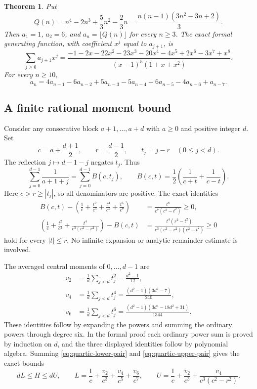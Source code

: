 \documentclass[11pt]{article}
\newtheorem{theorem}{Theorem}[section]
\begin{document}
\begin{theorem}\label{thm:quartic-main}
Put
\[
 Q(n)=n^4-2n^3+\frac53n^2-\frac23n
      =\frac{n(n-1)(3n^2-3n+2)}3.
\]
Then $a_1=1$, $a_2=6$, and $a_n=\lfloor Q(n)\rfloor$ for every $n\ge3$.
The exact formal generating function, with coefficient $x^j$ equal to
$a_{j+1}$, is
\begin{equation}\label{eq:quartic-gf}
 \sum_{j\ge0}a_{j+1}x^j=
 \frac{-1-2x-22x^2-23x^3-20x^4-4x^5+2x^6-3x^7+x^8}
 {(x-1)^5(1+x+x^2)}.
\end{equation}
For every $n\ge10$,
\begin{equation}\label{eq:quartic-recurrence}
 a_n=4a_{n-1}-6a_{n-2}+5a_{n-3}-5a_{n-4}
       +6a_{n-5}-4a_{n-6}+a_{n-7}.
\end{equation}
\end{theorem}

\subsection{A finite rational moment bound}

Consider any consecutive block $a+1,\ldots,a+d$ with $a\ge0$ and
positive integer $d$. Set
\[
 c=a+\frac{d+1}2,\qquad r=\frac{d-1}2,\qquad t_j=j-r\quad(0\le j<d).
\]
The reflection $j\mapsto d-1-j$ negates $t_j$. Thus
\begin{equation}\label{eq:quartic-pairing}
 \sum_{j=0}^{d-1}\frac1{a+1+j}
 =\sum_{j=0}^{d-1} B(c,t_j),\qquad
 B(c,t)=\frac12\left(\frac1{c+t}+\frac1{c-t}\right).
\end{equation}
Here $c>r\ge|t_j|$, so all denominators are positive.
The exact identities
\begin{align}
 B(c,t)-\left(\frac1c+\frac{t^2}{c^3}+\frac{t^4}{c^5}+\frac{t^6}{c^7}\right)
 &=\frac{t^8}{c^7(c^2-t^2)}\ge0,\label{eq:quartic-lower-pair}\\
 \left(\frac1c+\frac{t^2}{c^3}+\frac{t^4}{c^3(c^2-r^2)}\right)-B(c,t)
 &=\frac{t^4(r^2-t^2)}{c^3(c^2-r^2)(c^2-t^2)}\ge0
 \label{eq:quartic-upper-pair}
\end{align}
hold for every $|t|\le r$. No infinite expansion or analytic remainder
estimate is involved.

The averaged central moments of $0,\ldots,d-1$ are
\begin{align*}
 v_2&=\frac1d\sum_{j<d}t_j^2=\frac{d^2-1}{12},\\
 v_4&=\frac1d\sum_{j<d}t_j^4=\frac{(d^2-1)(3d^2-7)}{240},\\
 v_6&=\frac1d\sum_{j<d}t_j^6=\frac{(d^2-1)(3d^4-18d^2+31)}{1344}.
\end{align*}
These identities follow by expanding the powers and summing the ordinary
powers through degree six. In the formal proof each ordinary power sum
is proved by induction on $d$, and the three displayed identities follow
by polynomial algebra. Summing \eqref{eq:quartic-lower-pair} and
\eqref{eq:quartic-upper-pair} gives the exact bounds
\begin{equation}\label{eq:quartic-LU}
 dL\le H\le dU,\qquad
 L=\frac1c+\frac{v_2}{c^3}+\frac{v_4}{c^5}+\frac{v_6}{c^7},\qquad
 U=\frac1c+\frac{v_2}{c^3}+\frac{v_4}{c^3(c^2-r^2)}.
\end{equation}
\end{document}
